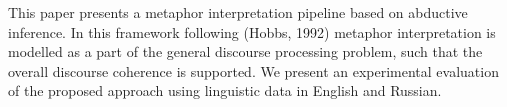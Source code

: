 This paper presents a metaphor interpretation pipeline based on abductive inference. In this framework following (Hobbs, 1992) metaphor interpretation is modelled as a part of the general discourse processing problem, such that the overall discourse coherence is supported. We present an experimental evaluation of the proposed approach using linguistic data in English and Russian.
